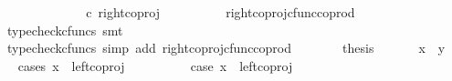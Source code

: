 \begin{isabellebody}
\ \ \ \ \isamarkupfalse%
\ \isamarkupfalse%
\ {\isachardoublequoteopen}{\isachardot}{\kern0pt}{\isachardot}{\kern0pt}{\isachardot}{\kern0pt}\ {\isacharequal}{\kern0pt}\ {\isasymlangle}{\isasymf}{\isacharcomma}{\kern0pt}\ {\isasymf}{\isasymrangle}\ {\isasymamalg}\ {\isasymlangle}{\isasymf}{\isacharcomma}{\kern0pt}{\isasymt}{\isasymrangle}\ {\isasymcirc}\isactrlsub c\ right{\isacharunderscore}{\kern0pt}coproj\ {\isasymone}\ {\isasymone}{\isachardoublequoteclose}\isanewline
\ \ \ \ \ \ \isamarkupfalse%
\ right{\isacharunderscore}{\kern0pt}coproj{\isacharunderscore}{\kern0pt}cfunc{\isacharunderscore}{\kern0pt}coprod\ \isamarkupfalse%
\ {\isacharparenleft}{\kern0pt}typecheck{\isacharunderscore}{\kern0pt}cfuncs{\isacharcomma}{\kern0pt}\ smt{\isacharparenright}{\kern0pt}\isanewline
\ \ \ \ \isamarkupfalse%
\ \isamarkupfalse%
\ {\isachardoublequoteopen}{\isachardot}{\kern0pt}{\isachardot}{\kern0pt}{\isachardot}{\kern0pt}\ {\isacharequal}{\kern0pt}\ {\isasymlangle}{\isasymf}{\isacharcomma}{\kern0pt}{\isasymt}{\isasymrangle}{\isachardoublequoteclose}\isanewline
\ \ \ \ \ \ \isamarkupfalse%
\ {\isacharparenleft}{\kern0pt}typecheck{\isacharunderscore}{\kern0pt}cfuncs{\isacharcomma}{\kern0pt}\ simp\ add{\isacharcolon}{\kern0pt}\ right{\isacharunderscore}{\kern0pt}coproj{\isacharunderscore}{\kern0pt}cfunc{\isacharunderscore}{\kern0pt}coprod{\isacharparenright}{\kern0pt}\isanewline
\ \ \ \ \isamarkupfalse%
\ \isamarkupfalse%
\ {\isacharquery}{\kern0pt}thesis\isacommand{{\isachardot}{\kern0pt}}\isamarkupfalse%
\isanewline
\ \ \isamarkupfalse%
\isanewline
\ \ \isamarkupfalse%
\ {\isachardoublequoteopen}x\ {\isacharequal}{\kern0pt}\ y{\isachardoublequoteclose}\isanewline
\ \ \isamarkupfalse%
{\isacharparenleft}{\kern0pt}cases\ {\isachardoublequoteopen}x\ {\isacharequal}{\kern0pt}\ left{\isacharunderscore}{\kern0pt}coproj\ {\isasymone}\ {\isacharparenleft}{\kern0pt}{\isasymone}\ {\isasymCoprod}\ {\isasymone}{\isacharparenright}{\kern0pt}{\isachardoublequoteclose}{\isacharparenright}{\kern0pt}\isanewline
\ \ \ \ \isamarkupfalse%
\ case{}{\isacharcolon}{\kern0pt}\ {\isachardoublequoteopen}x\ {\isacharequal}{\kern0pt}\ left{\isacharunderscore}{\kern0pt}coproj\ {\isasymone}\ {\isacharparenleft}{\kern0pt}{\isasymone}\ {\isasymCoprod}\ {\isasymone}{\isacharparenright}{\kern0pt}{\isachardoublequoteclose}\isanewline
\ \ \ \ \isamarkupfalse%

\end{isabellebody}
